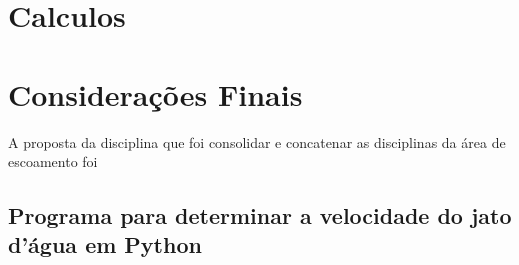 \documentclass[a4paper, 12pt, openany, oneside, brazil]{abntex2} %
\begin{document}


\chapter{Calculos}

\chapter*[Considerações Finais]{Considerações Finais}

    A proposta da disciplina que foi consolidar e concatenar as disciplinas da área de escoamento foi


% 



\begin{apendicesenv}


\chapter{Programa para determinar a velocidade do jato d'água em Python}
\label{ap-python}
 


\end{apendicesenv}
\end{document}
